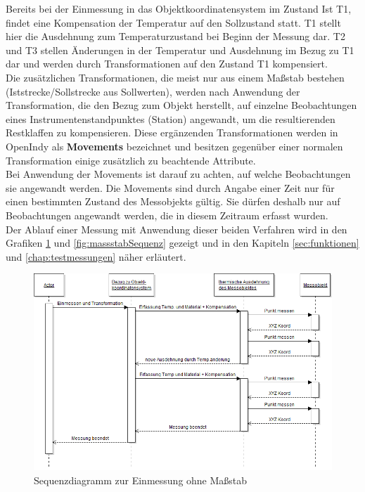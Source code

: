 Bereits bei der Einmessung in das Objektkoordinatensystem im Zustand \glqq Ist T1\grqq, findet eine Kompensation der Temperatur auf den Sollzustand statt. T1 stellt hier die Ausdehnung zum Temperaturzustand bei Beginn der Messung dar. T2 und T3 stellen Änderungen in der Temperatur und Ausdehnung im Bezug zu T1 dar und werden durch Transformationen auf den Zustand T1 kompensiert. \\
Die zusätzlichen Transformationen, die meist nur aus einem Maßstab bestehen (Iststrecke/Sollstrecke aus Sollwerten), werden nach Anwendung der Transformation, die den Bezug zum Objekt herstellt, auf einzelne Beobachtungen eines Instrumentenstandpunktes (Station) angewandt, um die resultierenden Restklaffen zu kompensieren. Diese ergänzenden Transformationen werden in OpenIndy als \textbf{Movements} bezeichnet und besitzen gegenüber einer normalen Transformation einige zusätzlich zu beachtende Attribute.\\
Bei Anwendung der Movements ist darauf zu achten, auf welche Beobachtungen sie angewandt werden. Die Movements sind durch Angabe einer Zeit nur für einen bestimmten Zustand des Messobjekts gültig. Sie dürfen deshalb nur auf Beobachtungen angewandt werden, die in diesem Zeitraum erfasst wurden.\\
Der Ablauf einer Messung mit Anwendung dieser beiden Verfahren wird in den Grafiken \ref{fig:ohnemassstabSequenz} und \ref{fig:massstabSequenz} gezeigt und in den Kapiteln \ref{sec:funktionen} und \ref{chap:testmessungen} näher erläutert.

\begin{figure}[H]
	\label{fig:ohnemassstabSequenz}
	\centering
		\includegraphics[scale=0.5]{UMLDiagramme/einmessen6paramSequenzUML}
	\caption[Sequenzdiagramm zur Einmessung ohne Maßstab]{Sequenzdiagramm zur Einmessung ohne Maßstab \protect\footnotemark}
\end{figure}

